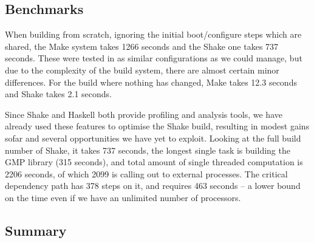 \subsection{Benchmarks\label{sec:benchmarks}}

When building from scratch, ignoring the initial boot/configure steps which are shared, the Make system takes 1266 seconds and the Shake one takes 737 seconds. These were tested in as similar configurations as we could manage, but due to the complexity of the build system, there are almost certain minor differences. For the build where nothing has changed, Make takes 12.3 seconds and Shake takes 2.1 seconds. 

Since Shake and Haskell both provide profiling and analysis tools, we have already used these features to optimise the Shake build, resulting in modest gains sofar and several opportunities we have yet to exploit. Looking at the full build number of Shake, it takes 737 seconds, the longest single task is building the GMP library (315 seconds), and total amount of single threaded computation is 2206 seconds, of which 2099 is calling out to external processes. The critical dependency path has 378 steps on it, and requires 463 seconds -- a lower bound on the time even if we have an unlimited number of processors.

\subsection{Summary}





